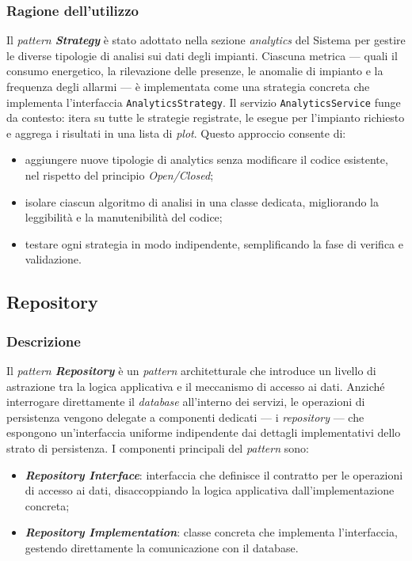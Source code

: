 \subsubsection{Ragione dell'utilizzo}
Il \textit{pattern \textbf{Strategy}} è stato adottato nella sezione \textit{analytics} del Sistema per gestire le diverse 
tipologie di analisi sui dati degli impianti. Ciascuna metrica — quali il consumo energetico, la rilevazione delle presenze, 
le anomalie di impianto e la frequenza degli allarmi — è implementata come una strategia concreta che implementa 
l'interfaccia \texttt{AnalyticsStrategy}. Il servizio \texttt{AnalyticsService} funge da contesto: itera su tutte le strategie 
registrate, le esegue per l'impianto richiesto e aggrega i risultati in una lista di \textit{plot}. Questo approccio consente di:
\begin{itemize}
    \item aggiungere nuove tipologie di analytics senza modificare il codice esistente, nel rispetto del principio 
    \textit{Open/Closed};
    \item isolare ciascun algoritmo di analisi in una classe dedicata, migliorando la leggibilità e la manutenibilità del codice;
    \item testare ogni strategia in modo indipendente, semplificando la fase di verifica e validazione.
\end{itemize}

\subsection{Repository}

\subsubsection{Descrizione}
Il \textit{pattern \textbf{Repository}} è un \textit{pattern} architetturale che introduce un livello di astrazione 
tra la logica applicativa e il meccanismo di accesso ai dati. Anziché interrogare direttamente 
il \textit{database} all'interno dei servizi, le operazioni di persistenza vengono delegate a componenti 
dedicati — i \textit{repository} — che espongono un'interfaccia uniforme indipendente dai 
dettagli implementativi dello strato di persistenza. I componenti principali del \textit{pattern} sono:
\begin{itemize}
    \item \textit{\textbf{Repository Interface}}: interfaccia che definisce il contratto per le operazioni 
    di accesso ai dati, disaccoppiando la logica applicativa dall'implementazione concreta;
    \item \textit{\textbf{Repository Implementation}}: classe concreta che implementa l'interfaccia, 
    gestendo direttamente la comunicazione con il database.
\end{itemize}

